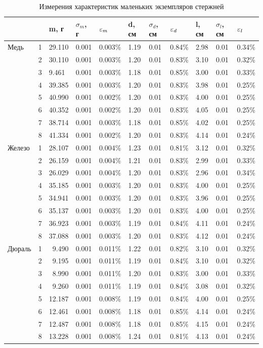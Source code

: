 \documentclass[a4paper,12pt]{article}
\numberwithin{equation}{section}
\begin{document}
\begin{enumerate}
\begin{table} [H] \center
\begin{tabular}{ll|lll|lll|lll}
&&m, г&$\sigma_m$, г&$\varepsilon_m$&d, см&$\sigma_d$, см&$\varepsilon_d$&l, см&$\sigma_l$, см&$\varepsilon_l$\\
\hline
Медь
&1&29.110&0.001&0.003\%&1.19&0.01&0.84\%&2.98&0.01&0.34\%\\
&2&30.110&0.001&0.003\%&1.20&0.01&0.83\%&3.10&0.01&0.32\%\\
&3&9.461&0.001&0.003\%&1.18&0.01&0.85\%&3.00&0.01&0.33\%\\
&4&39.385&0.001&0.003\%&1.20&0.01&0.83\%&3.98&0.01&0.25\%\\
&5&40.990&0.001&0.002\%&1.20&0.01&0.83\%&4.00&0.01&0.25\%\\
&6&40.352&0.001&0.002\%&1.20&0.01&0.83\%&4.05&0.01&0.25\%\\
&7&38.714&0.001&0.003\%&1.18&0.01&0.85\%&4.02&0.01&0.25\%\\
&8&41.334&0.001&0.002\%&1.20&0.01&0.83\%&4.14&0.01&0.24\%\\
\hline
Железо
&1&28.107&0.001&0.004\%&1.23&0.01&0.81\%&3.12&0.01&0.32\%\\
&2&26.159&0.001&0.004\%&1.21&0.01&0.83\%&2.99&0.01&0.33\%\\
&3&26.029&0.001&0.004\%&1.20&0.01&0.83\%&2.96&0.01&0.34\%\\
&4&35.185&0.001&0.003\%&1.20&0.01&0.83\%&4.00&0.01&0.25\%\\
&5&34.941&0.001&0.003\%&1.20&0.01&0.83\%&3.96&0.01&0.25\%\\
&6&35.137&0.001&0.003\%&1.20&0.01&0.83\%&4.00&0.01&0.25\%\\
&7&36.923&0.001&0.003\%&1.19&0.01&0.84\%&4.11&0.01&0.24\%\\
&8&37.088&0.001&0.003\%&1.20&0.01&0.83\%&4.12&0.01&0.24\%\\
\hline
Дюраль
&1&\ 9.490&0.001&0.011\%&1.22&0.01&0.82\%&3.10&0.01&0.32\%\\
&2&\ 9.195&0.001&0.011\%&1.19&0.01&0.84\%&3.10&0.01&0.32\%\\
&3&\ 8.990&0.001&0.011\%&1.20&0.01&0.83\%&3.00&0.01&0.33\%\\
&4&\ 9.260&0.001&0.011\%&1.19&0.01&0.84\%&3.08&0.01&0.32\%\\
&5&12.187&0.001&0.008\%&1.19&0.01&0.84\%&4.00&0.01&0.25\%\\
&6&12.461&0.001&0.008\%&1.18&0.01&0.85\%&4.14&0.01&0.24\%\\
&7&12.487&0.001&0.008\%&1.18&0.01&0.85\%&4.15&0.01&0.24\%\\
&8&13.228&0.001&0.008\%&1.24&0.01&0.81\%&4.13&0.01&0.24\%\\
\end{tabular}
\caption{Измерения характеристик маленьких экземпляров стержней}
\label{table:3}
\end{table}


\end{enumerate}
\end{document}
